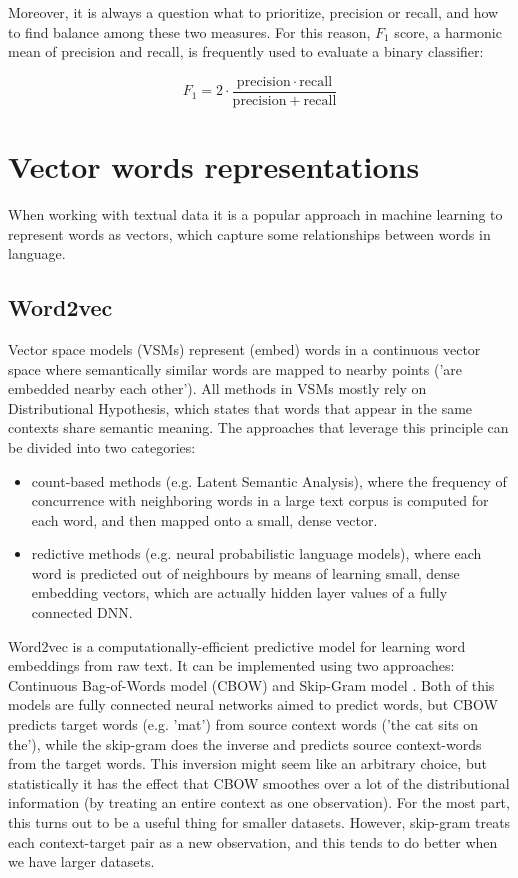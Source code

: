 Moreover, it is always a question what to prioritize, precision or recall, and how to find balance among these two measures. For this reason, $F_1$ score, a harmonic mean of precision and recall, is frequently used to evaluate a binary classifier:

\begin{equation}
    F_{1}=2\cdot {\frac {\mathrm {precision} \cdot \mathrm {recall} }{\mathrm {precision} +\mathrm {recall} }}
\end{equation} 

\section{Vector words representations}

When working with textual data it is a popular approach in machine learning to represent words as vectors, which capture some relationships between words in language.

\subsection{Word2vec}
Vector space models (VSMs) represent (embed) words in a continuous vector space where semantically similar words are mapped to nearby points ('are embedded nearby each other'). All methods in VSMs mostly rely on Distributional Hypothesis, which states that words that appear in the same contexts share semantic meaning. The approaches that leverage this principle can be divided into two categories:
\begin{itemize}
    \item count-based methods (e.g. Latent Semantic Analysis), where  the frequency of concurrence with neighboring words in a large text corpus is computed for each word, and then mapped onto a small, dense vector.
    \item redictive methods (e.g. neural probabilistic language models), where each word is predicted out of neighbours by means of learning small, dense embedding vectors, which are actually hidden layer values of a fully connected DNN. 
\end{itemize}

Word2vec is a computationally-efficient predictive model for learning word embeddings from raw text. It can be implemented using two approaches: Continuous Bag-of-Words model (CBOW) and  Skip-Gram model \cite{Mikolov-ICLR2013}. Both of this models are fully connected neural networks aimed to predict words, but CBOW predicts target words (e.g. 'mat') from source context words ('the cat sits on the'), while the skip-gram does the inverse and predicts source context-words from the target words. This inversion might seem like an arbitrary choice, but statistically it has the effect that CBOW smoothes over a lot of the distributional information (by treating an entire context as one observation). For the most part, this turns out to be a useful thing for smaller datasets. However, skip-gram treats each context-target pair as a new observation, and this tends to do better when we have larger datasets. 

